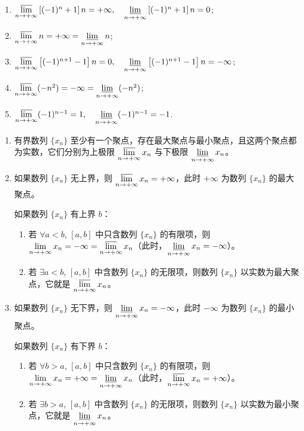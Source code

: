 \begin{example}\label{ex:1.5.2}
\begin{enumerate}
    \item $\varlimsup\limits_{n\to+\infty} \left[(-1)^n + 1\right]n = +\infty,\quad \varliminf\limits_{n\to+\infty} \left[(-1)^n + 1\right]n = 0$;
    \item $\varlimsup\limits_{n\to+\infty} n = +\infty = \varliminf\limits_{n\to+\infty} n$;
    \item $\varlimsup\limits_{n\to+\infty} \left[(-1)^{n+1} - 1\right]n = 0,\quad \varliminf\limits_{n\to+\infty} \left[(-1)^{n+1} - 1\right]n = -\infty$;
    \item $\varlimsup\limits_{n\to+\infty} (-n^2) = -\infty = \varliminf\limits_{n\to+\infty} (-n^2)$;
    \item $\varlimsup\limits_{n\to+\infty} (-1)^{n-1} = 1,\quad \varliminf\limits_{n\to+\infty} (-1)^{n-1} = -1$.
\end{enumerate}
\end{example}

\begin{theorem}\label{thm:1.5.1}
\begin{enumerate}
    \item 有界数列 $\{x_n\}$ 至少有一个聚点，存在最大聚点与最小聚点，且这两个聚点都为实数，它们分别为上极限 $\varlimsup\limits_{n\to+\infty} x_n$ 与下极限 $\varliminf\limits_{n\to+\infty} x_n$。
    \item 如果数列 $\{x_n\}$ 无上界，则 $\varlimsup\limits_{n\to+\infty} x_n = +\infty$，此时 $+\infty$ 为数列 $\{x_n\}$ 的最大聚点。
    
    如果数列 $\{x_n\}$ 有上界 $b$：
    \begin{enumerate}
        \item[①] 若 $\forall a < b$, $[a, b]$ 中只含数列 $\{x_n\}$ 的有限项，则 $\lim\limits_{n\to+\infty} x_n = -\infty = \varlimsup\limits_{n\to+\infty} x_n$（此时，$\varliminf\limits_{n\to+\infty} x_n = -\infty$）。
        \item[②] 若 $\exists a < b$, $[a, b]$ 中含数列 $\{x_n\}$ 的无限项，则数列 $\{x_n\}$ 以实数为最大聚点，它就是 $\varlimsup\limits_{n\to+\infty} x_n$。
    \end{enumerate}
    \item 如果数列 $\{x_n\}$ 无下界，则 $\varliminf\limits_{n\to+\infty} x_n = -\infty$，此时 $-\infty$ 为数列 $\{x_n\}$ 的最小聚点。
    
    如果数列 $\{x_n\}$ 有下界 $b$：
    \begin{enumerate}
        \item[①] 若 $\forall b > a$, $[a, b]$ 中只含数列 $\{x_n\}$ 的有限项，则 $\lim\limits_{n\to+\infty} x_n = +\infty = \varliminf\limits_{n\to+\infty} x_n$（此时，$\varlimsup\limits_{n\to+\infty} x_n = +\infty$）。
        \item[②] 若 $\exists b > a$, $[a, b]$ 中含数列 $\{x_n\}$ 的无限项，则数列 $\{x_n\}$ 以实数为最小聚点，它就是 $\varliminf\limits_{n\to+\infty} x_n$。
    \end{enumerate}
\end{enumerate}
\end{theorem}

